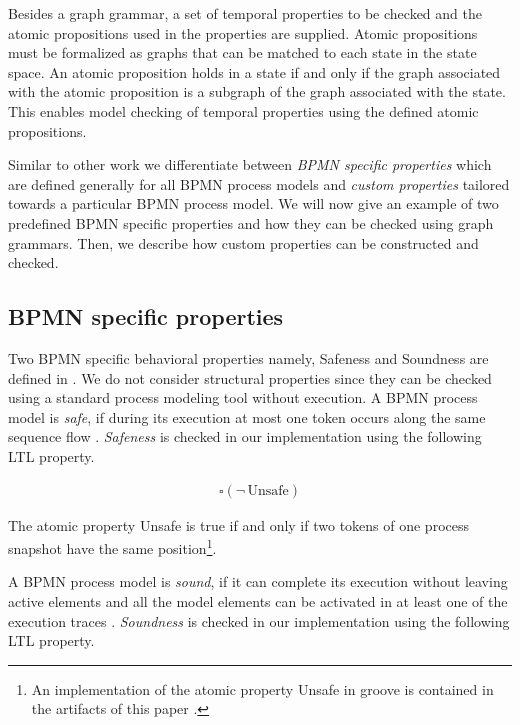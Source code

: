 \documentclass[adraft, copyright, creativecommons]{eptcs} %
\begin{document}
Besides a graph grammar, a set of temporal properties to be checked and the atomic propositions used in the properties are supplied.
Atomic propositions must be formalized as graphs that can be matched to each state in the state space.
An atomic proposition holds in a state if and only if the graph associated with the atomic proposition is a subgraph of the graph associated with the state. %
This enables model checking of temporal properties using the defined atomic propositions.

Similar to other work we differentiate between \emph{BPMN specific properties} which are defined generally for all BPMN process models and \emph{custom properties} tailored towards a particular BPMN process model.
We will now give an example of two predefined BPMN specific properties and how they can be checked using graph grammars.
Then, we describe how custom properties can be constructed and checked.

\subsection{BPMN specific properties}
Two BPMN specific behavioral properties namely, Safeness and Soundness are defined in \cite{corradiniClassificationBPMNCollaborations2018}.
We do not consider structural properties since they can be checked using a standard process modeling tool without execution.
A BPMN process model is \emph{safe}, if during its execution at most one token occurs along the same sequence flow \cite{corradiniClassificationBPMNCollaborations2018}.
\emph{Safeness} is checked in our implementation using the following LTL property.

\begin{align}
    \square (\neg \,\text{Unsafe}) \label{eq:safeness}
\end{align}

The atomic property \textsf{Unsafe} is true if and only if two tokens of one process snapshot have the same position\footnote{An implementation of the atomic property \textsf{Unsafe} in groove is contained in the artifacts of this paper \cite{ArtifactsTERMGRAPH2022}.}.

A BPMN process model is \emph{sound}, if it can complete its execution without leaving active elements and all the model elements can be activated in at least one of the execution traces \cite{corradiniClassificationBPMNCollaborations2018}.
\emph{Soundness} is checked in our implementation using the following LTL property.
\end{document}
